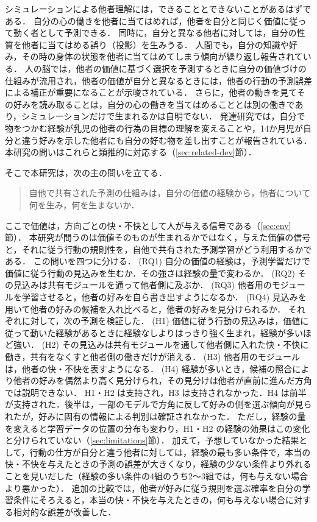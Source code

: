 シミュレーションによる他者理解には，できることとできないことがあるはずである．
自分の心の働きを他者に当てはめれば，他者を自分と同じく価値に従って動く者として予測できる．
同時に，自分と異なる他者に対しては，自分の性質を他者に当てはめる誤り（投影）を生みうる．
人間でも，自分の知識や好み，その時の身体の状態を他者に当てはめてしまう傾向が繰り返し報告されている\cite{ross1977false,nickerson1999how,vanboven2003social,epley2004perspective}．
人の脳では，他者の価値に基づく選択を予測するときに自分の価値づけの仕組みが流用され，他者の価値が自分と異なるときには，他者の行動の予測誤差による補正が重要になることが示唆されている\cite{suzuki2012learning}．
さらに，他者の動きを見てその好みを読み取ることは，自分の心の働きを当てはめることとは別の働きであり，シミュレーションだけで生まれるかは自明でない．
発達研究では，自分で物をつかむ経験が乳児の他者の行為の目標の理解を変えること\cite{sommerville2005action}や，14か月児が自分と違う好みを示した他者にも自分の好む物を差し出すこと\cite{repacholi1997early}が報告されている．
本研究の問いはこれらと類推的に対応する（\ref{sec:related-dev}節）．

そこで本研究は，次の主の問いを立てる．
\begin{quote}
  自他で共有された予測の仕組みは，自分の価値の経験から，他者について何を生み，何を生まないか．
\end{quote}
ここで価値は，方向ごとの快・不快として人が与える信号である（\ref{sec:env}節）．
本研究が問うのは価値そのものが生まれるかではなく，与えた価値の信号と，それに従う行動の規則性を，自他で共有された予測学習がどう利用するかである．
この問いを四つに分ける．
(RQ1) 自分の価値の経験は，予測学習だけで価値に従う行動の見込みを生むか．その強さは経験の量で変わるか．
(RQ2) その見込みは共有モジュールを通って他者側に及ぶか．
(RQ3) 他者用のモジュールを学習させると，他者の好みを自ら書き出すようになるか．
(RQ4) 見込みを用いて他者の好みの候補を入れ比べると，他者の好みを見分けられるか．
それぞれに対して，次の予測を検証した．
(H1) 価値に従う行動の見込みは，価値に従って動いた経験があるときに経験なしよりはっきり強く生まれ，経験が多いほど強い．
(H2) その見込みは共有モジュールを通して他者側に入れた快・不快に働き，共有をなくすと他者側の働きだけが消える．
(H3) 他者用のモジュールは，他者の快・不快を表すようになる．
(H4) 経験が多いとき，候補の照合により他者の好みを偶然より高く見分けられ，その見分けは他者が直前に進んだ方角では説明できない．
H1・H2 は支持され，H3 は支持されなかった．H4 は前半が支持された．後半は，一部のモデルで方角に反して好みの側を選ぶ傾向が見られたが，好みに固有の情報による判別は確証されなかった．
ただし，経験の量を変えると学習データの位置の分布も変わり，H1・H2 の経験の効果はこの変化と分けられていない（\ref{sec:limitations}節）．
加えて，予想していなかった結果として，行動の仕方が自分と違う他者に対しては，経験の最も多い条件で，本当の快・不快を与えたときの予測の誤差が大きくなり，経験の少ない条件より外れることを見いだした（経験の多い条件の4組のうち2〜3組では，何も与えない場合より悪かった）．
追加の比較では，他者が好みに従う規則を選ぶ確率を自分の学習条件にそろえると，本当の快・不快を与えたときの，何も与えない場合に対する相対的な誤差が改善した．

